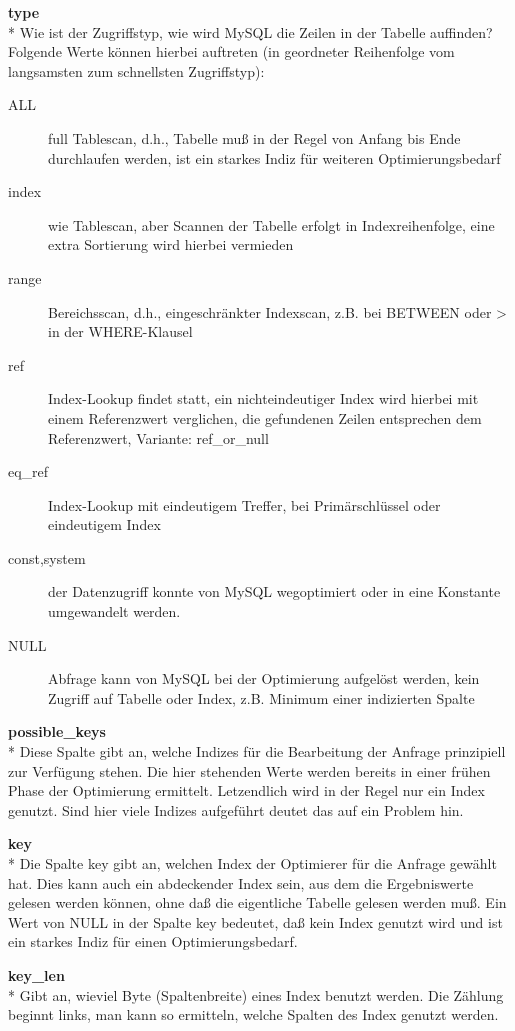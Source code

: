 \textbf{type}\\*
Wie ist der Zugriffstyp, wie wird MySQL die Zeilen in der Tabelle auffinden? Folgende Werte können hierbei auftreten (in geordneter Reihenfolge vom langsamsten zum schnellsten Zugriffstyp):
\begin{description}
\item[ALL] full Tablescan, d.h., Tabelle muß in der Regel von Anfang bis Ende durchlaufen werden, ist ein starkes Indiz für weiteren Optimierungsbedarf
\item[index] wie Tablescan, aber Scannen der Tabelle erfolgt in Indexreihenfolge, eine extra Sortierung wird hierbei vermieden
\item[range] Bereichsscan, d.h., eingeschränkter Indexscan, z.B. bei BETWEEN oder > in der WHERE-Klausel
\item[ref] Index-Lookup findet statt, ein nichteindeutiger Index wird hierbei mit einem Referenzwert verglichen, die gefundenen Zeilen entsprechen dem Referenzwert, Variante: ref\_or\_null
\item[eq\_ref] Index-Lookup mit eindeutigem Treffer, bei Primärschlüssel oder eindeutigem Index
\item[const,system] der Datenzugriff konnte von MySQL wegoptimiert oder in eine Konstante umgewandelt werden.
\item[NULL] Abfrage kann von MySQL bei der Optimierung aufgelöst werden, kein Zugriff auf Tabelle oder Index, z.B. Minimum einer indizierten Spalte
\end{description}

\textbf{possible\_keys}\\*
Diese Spalte gibt an, welche Indizes für die Bearbeitung der Anfrage prinzipiell zur Verfügung stehen.
Die hier stehenden Werte werden bereits in einer frühen Phase der Optimierung ermittelt. Letzendlich wird in der Regel nur ein Index genutzt. Sind hier viele Indizes aufgeführt deutet das auf ein Problem hin.

\textbf{key}\\*
Die Spalte key gibt an, welchen Index der Optimierer für die Anfrage gewählt hat. Dies kann auch ein abdeckender Index sein, aus dem die Ergebniswerte gelesen werden können, ohne daß die eigentliche Tabelle gelesen werden muß. Ein Wert von NULL in der Spalte key bedeutet, daß kein Index genutzt wird und ist ein starkes Indiz für einen Optimierungsbedarf.

\textbf{key\_len}\\*
Gibt an, wieviel Byte (Spaltenbreite) eines Index benutzt werden. Die Zählung beginnt links, man kann so ermitteln, welche Spalten des Index genutzt werden.


